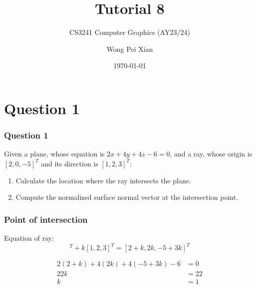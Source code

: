 \documentclass{beamer}
\title{Tutorial 8}
\subtitle{CS3241 Computer Graphics (AY23/24)}
\date{\today}
\author{Wong Pei Xian}
\institute[]{\email{e0389023@u.nus.edu}}
\begin{document}
\frame[plain]{\titlepage}

\section{Question 1}

\begin{frame}
    \frametitle{Question 1}

    \vspace{1em}
    Given a plane, whose equation is $2x + 4y + 4z - 6 = 0$, 
    and a ray, whose origin is $[2, 0, -5]^T$ and its direction is $[1, 2, 3]^T$:

    \begin{enumerate}
        \item Calculate the location where the ray intersects the plane.
        \item Compute the normalized surface normal vector at the intersection point.
    \end{enumerate}

\end{frame}

\begin{frame}
    \frametitle{Point of intersection}

    \begin{tcolorbox}
        Equation of ray: \\
        \begin{equation*}
            [2, 0, -5]^T + k[1, 2, 3]^T = [2 + k, 2k, -5 +3k]^T
        \end{equation*}
    \end{tcolorbox}

    \begin{eqnarray*}
        2(2 + k) + 4(2k) + 4(-5 + 3k) - 6 &= 0\\
        22k &= 22\\
        k &= 1\\
    \end{eqnarray*}

\end{frame}
\end{document}
